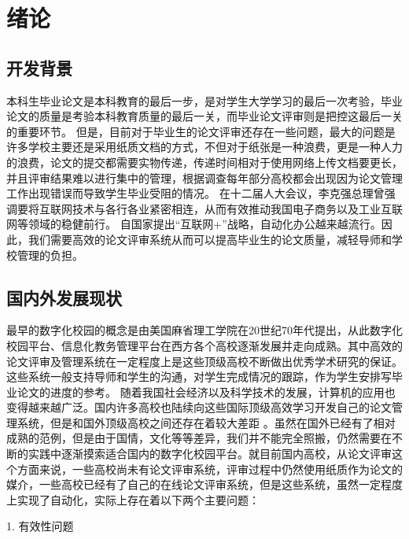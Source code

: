 
\chapter{绪论}
\label{chap02}
\section{开发背景}

本科生毕业论文是本科教育的最后一步，是对学生大学学习的最后一次考验，毕业论文的质量是考验本科教育质量的最后一关\cite{.2019}，而毕业论文评审则是把控这最后一关的重要环节。
但是，目前对于毕业生的论文评审还存在一些问题，最大的问题是许多学校主要还是采用纸质文档的方式，不但对于纸张是一种浪费，更是一种人力的浪费，论文的提交都需要实物传递，传递时间相对于使用网络上传文档要更长，并且评审结果难以进行集中的管理\cite{.2017e}，根据调查每年部分高校都会出现因为论文管理工作出现错误而导致学生毕业受阻的情况\cite{.2018}。
在十二届人大会议，李克强总理曾强调要将互联网技术与各行各业紧密相连，从而有效推动我国电子商务以及工业互联网等领域的稳健前行\cite{.2020c}。
自国家提出“互联网+”战略\cite{.20183}，自动化办公越来越流行。因此，我们需要高效的论文评审系统从而可以提高毕业生的论文质量，减轻导师和学校管理的负担\cite{.2019d}。

\section{国内外发展现状}

最早的数字化校园的概念是由美国麻省理工学院在20世纪70年代提出\cite{张磊2020数字校园下高职院校教务管理系统设计}，从此数字化校园平台、信息化教务管理平台在西方各个高校逐渐发展并走向成熟。其中高效的论文评审及管理系统在一定程度上是这些顶级高校不断做出优秀学术研究的保证。这些系统一般支持导师和学生的沟通，对学生完成情况的跟踪，作为学生安排写毕业论文的进度的参考。
随着我国社会经济以及科学技术的发展，计算机的应用也变得越来越广泛\cite{.2020h}。国内许多高校也陆续向这些国际顶级高效学习开发自己的论文管理系统，但是和国外顶级高校之间还存在着较大差距 \cite{.2017e}。虽然在国外已经有了相对成熟的范例，但是由于国情，文化等等差异，我们并不能完全照搬，仍然需要在不断的实践中逐渐摸索适合国内的数字化校园平台。就目前国内高校，从论文评审这个方面来说，一些高校尚未有论文评审系统，评审过程中仍然使用纸质作为论文的媒介，一些高校已经有了自己的在线论文评审系统，但是这些系统，虽然一定程度上实现了自动化，实际上存在着以下两个主要问题：

1. 有效性问题

